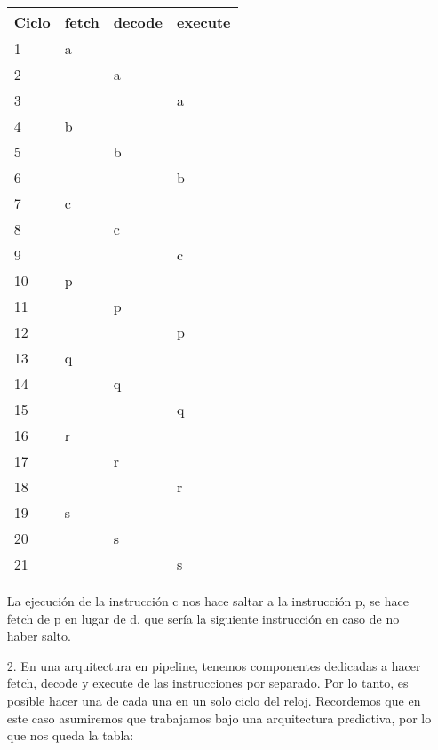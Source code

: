\documentclass[dcc,sol]{fcfmcourse}
\begin{document}
\begin{problems}
\begin{solution}
\begin{enumerate}
        \begin{table}[h]
        \centering
        \begin{tabular}{|l|l|l|l|}
        \hline
        Ciclo & fetch & decode & execute \\ \hline
        1     & a     &        &         \\ \hline
        2     &       & a      &         \\ \hline
        3     &       &        & a       \\ \hline
        4     & b     &        &         \\ \hline
        5     &       & b      &         \\ \hline
        6     &       &        & b       \\ \hline
        7     & c     &        &         \\ \hline
        8     &       & c      &         \\ \hline
        9     &       &        & c       \\ \hline
        10    & p     &        &         \\ \hline
        11    &       & p      &         \\ \hline
        12    &       &        & p       \\ \hline
        13    & q     &        &         \\ \hline
        14    &       & q      &         \\ \hline
        15    &       &        & q       \\ \hline
        16    & r     &        &         \\ \hline
        17    &       & r      &         \\ \hline
        18    &       &        & r       \\ \hline
        19    & s     &        &         \\ \hline
        20    &       & s      &         \\ \hline
        21    &       &        & s       \\ \hline
        \end{tabular}
        \end{table}

        La ejecución de la instrucción c nos hace saltar a la instrucción p, se hace fetch de p en lugar de d, que sería la siguiente instrucción en caso de no haber salto.

        \newpage
        \item[2.] En una arquitectura en pipeline, tenemos componentes dedicadas a hacer fetch, decode y execute de las instrucciones por separado. Por lo tanto, es posible hacer una de cada una en un solo ciclo del reloj. Recordemos que en este caso asumiremos que trabajamos bajo una arquitectura predictiva, por lo que nos queda la tabla:


\end{enumerate}
\end{solution}
\end{problems}
\end{document}
